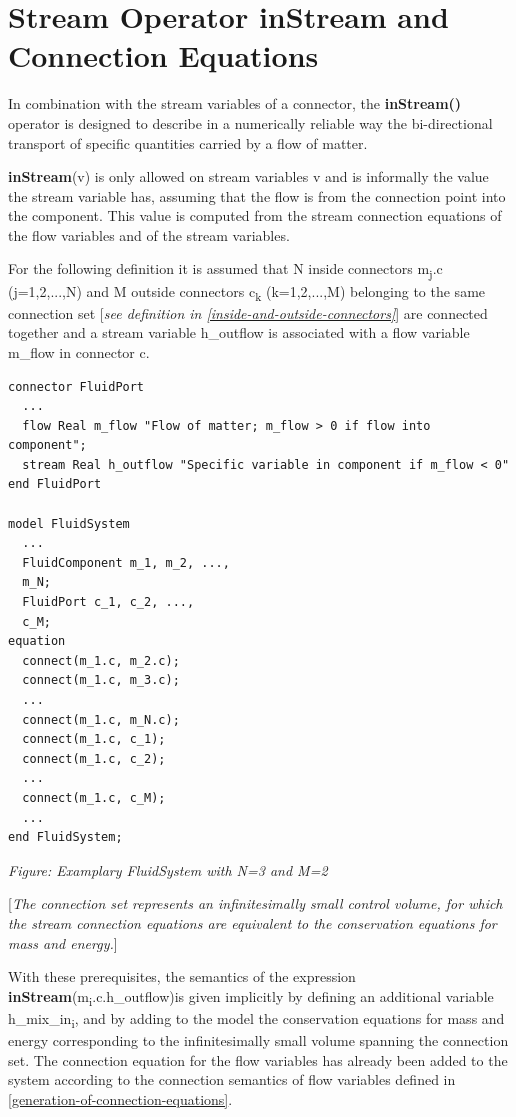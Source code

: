 \documentclass[10pt,a4paper]{report}
\def\doublelabel#1{\label{#1}\hypertarget{#1}{}}
\begin{document}
\section{Stream Operator inStream and Connection Equations}\doublelabel{stream-operator-instream-and-connection-equations}

In combination with the stream variables of a connector, the
\textbf{inStream()} operator is designed to describe in a numerically
reliable way the bi-directional transport of specific quantities carried
by a flow of matter.

\textbf{inStream}(v) is only allowed on stream variables v and is
informally the value the stream variable has, assuming that the flow is
from the connection point into the component. This value is computed
from the stream connection equations of the flow variables and of the
stream variables.

For the following definition it is assumed that N inside connectors
m\textsubscript{j}.c (j=1,2,...,N) and M outside connectors
c\textsubscript{k} (k=1,2,...,M) belonging to the same connection set
{[}\emph{see definition in \ref{inside-and-outside-connectors}}{]} are connected
together and a stream variable h\_outflow is associated with a flow
variable m\_flow in connector c.

\begin{lstlisting}[language=modelica]
connector FluidPort
  ...
  flow Real m_flow "Flow of matter; m_flow > 0 if flow into component";
  stream Real h_outflow "Specific variable in component if m_flow < 0"
end FluidPort

model FluidSystem
  ...
  FluidComponent m_1, m_2, ...,
  m_N;
  FluidPort c_1, c_2, ...,
  c_M;
equation
  connect(m_1.c, m_2.c);
  connect(m_1.c, m_3.c);
  ...
  connect(m_1.c, m_N.c);
  connect(m_1.c, c_1);
  connect(m_1.c, c_2);
  ...
  connect(m_1.c, c_M);
  ...
end FluidSystem;
\end{lstlisting}

\emph{Figure: Examplary FluidSystem with N=3 and M=2}

{[}\emph{The connection set represents an infinitesimally small control
volume, for which the stream connection equations are equivalent to the
conservation equations for mass and energy.}{]}

With these prerequisites, the semantics of the expression
\textbf{inStream}(m\textsubscript{i}.c.h\_outflow)is given implicitly by
defining an additional variable h\_mix\_in\textsubscript{i}, and by
adding to the model the conservation equations for mass and energy
corresponding to the infinitesimally small volume spanning the
connection set. The connection equation for the flow variables has
already been added to the system according to the connection semantics
of flow variables defined in \ref{generation-of-connection-equations}.
\end{document}
